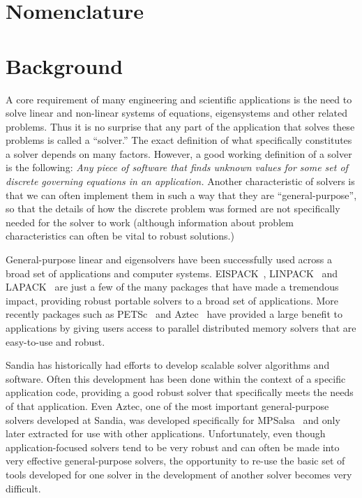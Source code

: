 \documentclass[12pt,relax]{TrilinosOverview}
\begin{document}
\section*{Nomenclature}


\section{Background}

A core requirement of many engineering and scientific applications is 
the need to solve linear and non-linear systems of equations, eigensystems 
and other related problems.  Thus it is no surprise that any 
part of the application that solves these problems is called a ``solver.'' 
The exact definition of what specifically constitutes a solver depends on 
many factors.  However, a good working definition of a solver is
the following: {\it Any piece of software that finds unknown values for 
some set of discrete governing equations in 
an application.}  Another characteristic of solvers is that we can often 
implement them in such a way that they are ``general-purpose'', so that the
details of how the discrete problem was formed are not specifically needed 
for the solver to work (although information about problem characteristics 
can often be vital to robust solutions.)

General-purpose linear and eigensolvers have been successfully used across 
a broad set of applications and computer systems.  EISPACK~\cite{eispack}, 
LINPACK~\cite{linpack} and LAPACK~\cite{lapack} are just a few of
the many packages that have made a tremendous impact, providing robust 
portable solvers to a broad set of applications.  More recently packages 
such as PETSc~\cite{petsc-home-page,petsc-manual,petsc-efficient} 
and Aztec~\cite{Aztec2.1} have provided a large
benefit to applications by giving users access to parallel distributed 
memory solvers that are easy-to-use and robust.

Sandia has historically had efforts to develop scalable solver algorithms 
and software.  Often this development has been done within the context of 
a specific application code, providing a good robust solver that 
specifically meets the needs of that application.  Even Aztec, one of 
the most important general-purpose solvers developed at Sandia, was 
developed specifically for MPSalsa~\cite{MPSalsa-User-Guide,MPSalsa-Theory} 
and only later extracted for use with other applications.  Unfortunately, 
even though application-focused solvers tend to be very robust and can 
often be made into very effective general-purpose solvers, the 
opportunity to re-use the basic set of tools developed for one solver 
in the development of another solver becomes very difficult.
\end{document}
